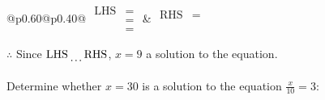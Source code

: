 \documentclass[12pt]{article}
\newcounter{minipagecount}
\begin{document}
\begin{multicols}{2}
\begin{minipage}[t]{0.40\textwidth}
    \noindent
    \renewcommand{\arraystretch}{1.3} %
    \begin{tabular}{@{}p{0.60\linewidth}@{}p{0.40\linewidth}@{}}
        \(\begin{aligned}
            \text{LHS} &=  \\
                    &=  \\
                    &= 
        \end{aligned}\) &
        \(\begin{aligned}
            \text{RHS} &= \\
                    & \\
                    &
        \end{aligned}\)
    \end{tabular}
    \renewcommand{\arraystretch}{1.0} %
    \vspace{2pt}  %

    \noindent \(\therefore\) Since \(\text{LHS} \dotuline{\hspace{5mm}} \text{RHS}\), \(x = 9\) \dotuline{\hspace{12mm}} a solution to the equation.

\end{minipage}

\vspace*{0.5ex}
\vfill{}
\noindent{(\theminipagecount)}\hspace{0.1mm} %
\begin{minipage}[t]{0.40\textwidth} %

    \noindent Determine whether \(x = 30\) is a solution to the equation \(\frac{x}{10} = 3\):
    \vspace{2pt}  %


\end{minipage}
\end{multicols}
\end{document}
